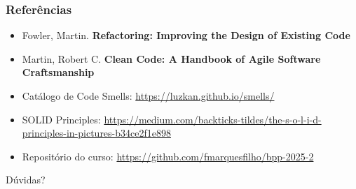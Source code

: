 \documentclass[aspectratio=169]{beamer}
\begin{document}
\begin{frame}
\frametitle{Referências}
\footnotesize
\begin{itemize}
    \item Fowler, Martin. \textbf{Refactoring: Improving the Design of Existing Code}
    \item Martin, Robert C. \textbf{Clean Code: A Handbook of Agile Software Craftsmanship}
    \item Catálogo de Code Smells: \url{https://luzkan.github.io/smells/}
    \item SOLID Principles: \url{https://medium.com/backticks-tildes/the-s-o-l-i-d-principles-in-pictures-b34ce2f1e898}
    \item Repositório do curso: \url{https://github.com/fmarquesfilho/bpp-2025-2}
\end{itemize}

\vspace{0.5cm}
\begin{center}
\Large
Dúvidas?
\end{center}
\end{frame}
\end{document}
